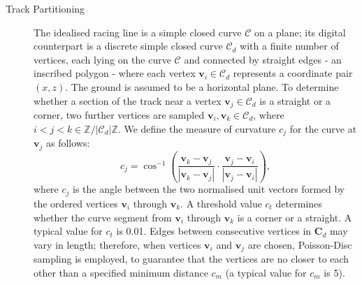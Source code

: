 \begin{description}
	\item [Track Partitioning] The idealised racing line is a simple closed curve $\mathcal{C}$ on a plane; its digital counterpart is a discrete simple closed curve $\mathcal{C}_d$ with a finite number of vertices, each lying on the curve $\mathcal{C}$ and connected by straight edges - an inscribed polygon - where each vertex $\mathbf{v}_i \in \mathcal{C}_d$ represents a coordinate pair $(x,z)$. The ground is assumed to be a horizontal plane. 	To determine whether a section of the track near a vertex $\mathbf{v}_j \in \mathcal{C}_d$ is a straight or a corner, two further vertices are sampled $\mathbf{v}_i, \mathbf{v}_k \in \mathcal{C}_d$, where $i < j < k \in \mathbb{Z}/|\mathcal{C}_d|\mathbb{Z}$. We define the measure of curvature $c_j$ for the curve at $\mathbf{v}_j$ as follows:
	\begin{equation}
		c_j = \cos^{-1} \left(\frac{\mathbf{v}_k - \mathbf{v}_j}{|\mathbf{v}_k - \mathbf{v}_j|} \cdot \frac{\mathbf{v}_j - \mathbf{v}_i}{|\mathbf{v}_j - \mathbf{v}_i|} \right),
	\end{equation}
	where $c_j$ is the angle between the two normalised unit vectors formed by the ordered vertices $\mathbf{v}_i$ through $\mathbf{v}_k$. A threshold value $c_t$ determines whether the curve segment from $\mathbf{v}_i$ through $\mathbf{v}_k$ is a corner or a straight. A typical value for $c_t$ is 0.01. Edges between consecutive vertices in $\mathbf{C}_d$ may vary in length; therefore, when vertices $\mathbf{v}_i$ and $\mathbf{v}_j$ are chosen, Poisson-Disc sampling is employed, to guarantee that the vertices are no closer to each other than a specified minimum distance $c_m$ (a typical value for $c_m$ is 5).  	

	

\end{description}
